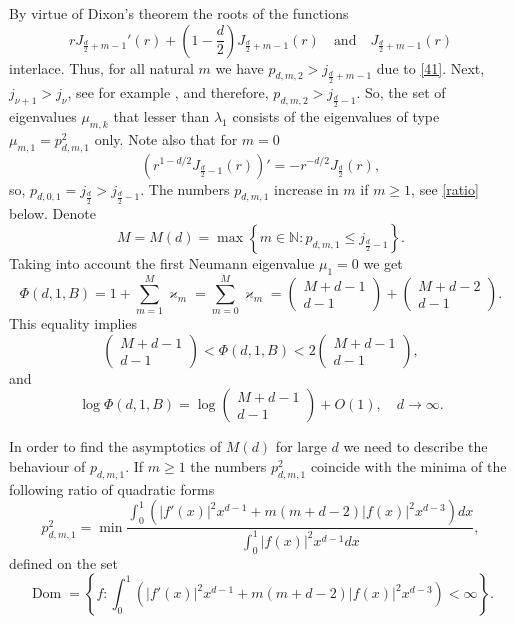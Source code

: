\documentclass[a4paper,12pt]{article}
\numberwithin{equation}{section}
\def \ka{\varkappa}
\def \la{\lambda}
\def \N{\mathbb{N}}
\def\dom{\operatorname{Dom}}
\newcommand{\<}{\langle}
\renewcommand{\>}{\rangle}
\theoremstyle{plain}
\theoremstyle{definition}
\theoremstyle{remark}
\renewcommand{\le}{\leqslant}
\renewcommand{\ge}{\geqslant}
\begin{document}
By virtue of Dixon's theorem \cite[\S 15.23]{Watson} the roots of the functions
$$
r J_{\frac{d}2 + m -1}' (r) + \left(1-\frac{d}2\right) J_{\frac{d}2 + m -1} (r)
\quad \text{and} \quad J_{\frac{d}2 + m -1} (r)
$$
interlace.
Thus, for all natural $m$ we have $p_{d,m,2} > j_{\frac{d}2+m-1}$
due to \eqref{41}.
Next, $j_{\nu+1} > j_\nu$, see for example \cite[\S 15.22]{Watson},
and therefore, $p_{d,m,2} > j_{\frac{d}2-1}$.
So, the set of eigenvalues $\mu_{m,k}$ that lesser than $\la_1$
consists of the eigenvalues of type $\mu_{m,1} = p_{d,m,1}^2$ only.
Note also that for $m=0$
$$
\left(r^{1-d/2} J_{\frac{d}2-1} (r)\right)' = - r^{-d/2} J_{\frac{d}2} (r),
$$
so, $p_{d,0,1} = j_{\frac{d}2} > j_{\frac{d}2-1}$.
The numbers $p_{d,m,1}$ increase in $m$ if $m \ge 1$, see \eqref{ratio} below.
Denote 
\begin{equation}
\label{42}
M = M(d) = \max \left\{m \in \N : p_{d,m,1} \le j_{\frac{d}2-1}\right\}.
\end{equation}
Taking into account the first Neumann eigenvalue $\mu_1=0$ we get
$$
\Phi (d,1,B) = 1 + \sum_{m=1}^M \ka_m = \sum_{m=0}^M \ka_m
= \left( \begin{array}{cc} M + d - 1 \\ d-1 \end{array} \right)  
+ \left( \begin{array}{cc} M + d - 2 \\ d-1 \end{array} \right) .
$$
This equality implies
$$
\left( \begin{array}{cc} M + d - 1 \\ d-1 \end{array} \right) 
< \Phi (d,1,B) < 2 \left( \begin{array}{cc} M + d - 1 \\ d-1 \end{array} \right) ,
$$
and
\begin{equation}
\label{43}
\log \Phi (d,1,B) = \log \left( \begin{array}{cc} M + d - 1 \\ d-1 \end{array} \right) 
+ O (1), \quad d \to \infty.
\end{equation}

In order to find the asymptotics of $M(d)$ for large $d$ we need 
to describe the behaviour of $p_{d,m,1}$.
If $m \ge 1$ the numbers $p_{d,m,1}^2$ coincide with the minima
of the following ratio of quadratic forms
\begin{equation}
\label{ratio}
p_{d,m,1}^2 = \min \frac{\int_0^1\left(|f'(x)|^2 x^{d-1} 
+ m (m+d-2) |f(x)|^2 x^{d-3}\right) dx}
{\int_0^1|f(x)|^2 x^{d-1} dx},
\end{equation}
defined on the set
\begin{equation*}
\label{dom}
\dom = \left\{ f : 
\int_0^1\left(|f'(x)|^2 x^{d-1} + m (m+d-2) |f(x)|^2 x^{d-3} \right) < \infty \right\}.
\end{equation*}
\end{document}
